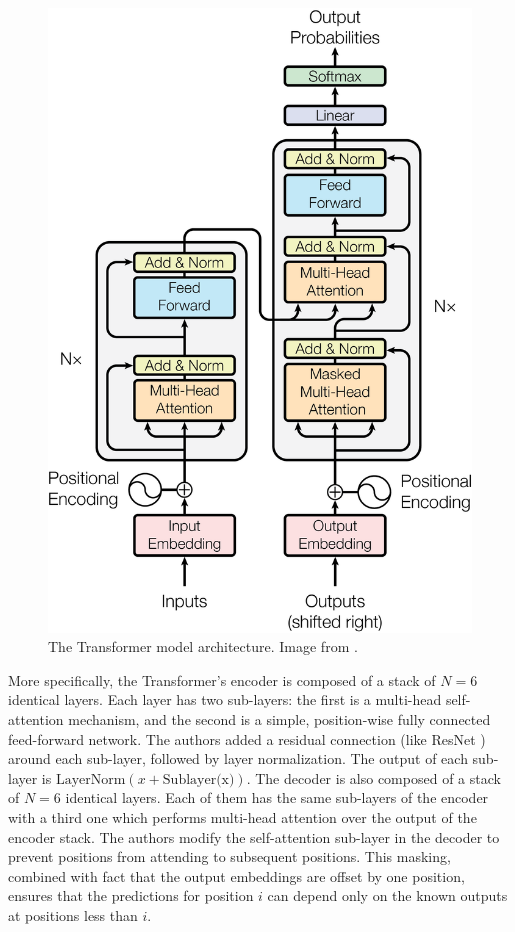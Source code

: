 \begin{figure}[h!]
	\centering
	\includegraphics[width=0.7\linewidth]{images/transformerarchitecture.png}
	\caption{The Transformer model architecture. Image from \cite{transformer}.}
	\label{fig:transformerarc}
\end{figure}

More specifically, the Transformer's encoder  is composed of a stack of $N = 6$ identical layers. Each layer has two sub-layers: the first is a multi-head self-attention mechanism, and the second is a simple, position-wise fully connected feed-forward network. The authors added a residual connection (like ResNet \cite{resnet}) around each sub-layer, followed by layer normalization. The output of each sub-layer is $\text{LayerNorm}(x + \text{Sublayer(x)})$. The decoder is also composed of a stack of $N = 6$ identical layers. Each of them has the same sub-layers of the encoder with a third one which performs multi-head attention over the output of the encoder stack. The authors modify the self-attention
sub-layer in the decoder to prevent positions from attending to subsequent positions. This masking, combined with fact that the output embeddings are offset by one position, ensures that the predictions for position $i$ can depend only on the known outputs at positions less than $i$.

